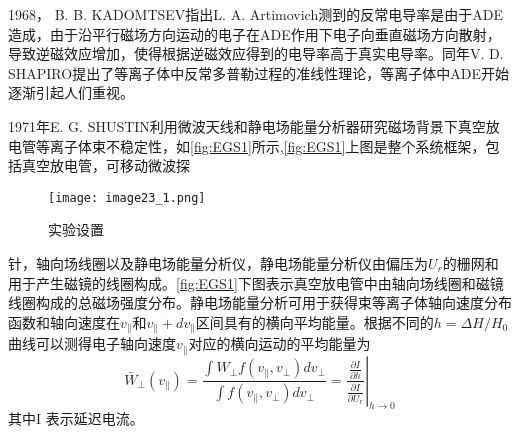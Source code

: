 \par 1968， B. B. KADOMTSEV指出L. A. Artimovich测到的反常电导率是由于ADE造成\cite{RN964}，由于沿平行磁场方向运动的电子在ADE作用下电子向垂直磁场方向散射，导致逆磁效应增加，使得根据逆磁效应得到的电导率高于真实电导率。同年V. D. SHAPIRO\cite{RN1425}提出了等离子体中反常多普勒过程的准线性理论，等离子体中ADE开始逐渐引起人们重视。
\par 1971年E. G. SHUSTIN利用微波天线和静电场能量分析器研究磁场背景下真空放电管等离子体束不稳定性\cite{RN786}，如\autoref{fig:EGS1}所示,\autoref{fig:EGS1}上图是整个系统框架，包括真空放电管，可移动微波探
\begin{figure}[ht]
\centering
\texttt{[image: image23\_1.png]}
\caption{\label{fig:EGS1}实验设置}
\end{figure}
针，轴向场线圈以及静电场能量分析仪，静电场能量分析仪由偏压为$U_r$的栅网和用于产生磁镜的线圈构成。\autoref{fig:EGS1}下图表示真空放电管中由轴向场线圈和磁镜线圈构成的总磁场强度分布。静电场能量分析可用于获得束等离子体轴向速度分布函数和轴向速度在$v_∥$和$v_∥+dv_∥$区间具有的横向平均能量。根据不同的$h=ΔH/H_0 $曲线可以测得电子轴向速度$v_∥$对应的横向运动的平均能量为
\begin{equation}
\bar{W}_{\perp}\left(v_{\|}\right)=\frac{\int W_{\perp} f\left(v_{\|}, v_{\perp}\right) d v_{\perp}}{\int f\left(v_{\|}, v_{\perp}\right) d v_{\perp}}=\left.\frac{\frac{\partial I}{\partial h}}{\frac{\partial I}{\partial U_{r}}}\right|_{h \rightarrow 0}
\end{equation}
其中I 表示延迟电流。

